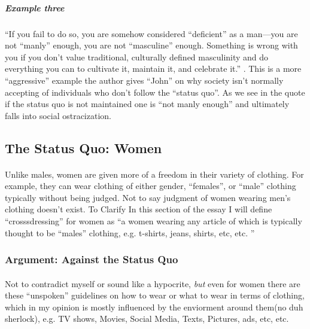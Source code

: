 \subparagraph{Example three}
``If you fail to do so, you are somehow considered ``deficient'' as a man---you
are not ``manly'' enough, you are not ``masculine'' enough. Something is wrong
with you if you don’t value traditional, culturally defined masculinity and do
everything you can to cultivate it, maintain it, and celebrate it.''
\cite[p.~1]{WDTMU} . This is a more ``aggressive'' example the author gives
``John'' on why society isn't normally accepting of individuals who don't follow
the ``status quo''. As we see in the quote if the status quo is not maintained
one is ``not manly enough'' and ultimately falls into social ostracization.

\subsection{The Status Quo: Women}
\paragraph{}
Unlike males, women are given more of a freedom in their variety of clothing.
For example, they can wear clothing of either gender, ``females'', or ``male''
clothing typically without being judged. Not to say judgment of women wearing
men's clothing doesn't exist. To Clarify In this section of the essay I will
define ``crosssdressing'' for women as ``a women wearing any article of which
is typically thought to be ``males'' clothing, e.g. t-shirts, jeans, shirts,
etc, etc. ''
\par

\subsubsection{Argument: Against the Status Quo}
\paragraph{}
Not to contradict myself or sound like a hypocrite, \textit{but} even for women
there are these ``unspoken'' guidelines on how to wear or what to wear in terms
of clothing, which in my opinion is mostly influenced by the enviorment around
them(no duh sherlock), e.g. TV shows, Movies, Social Media, Texts, Pictures,
ads, etc, etc.
\par


